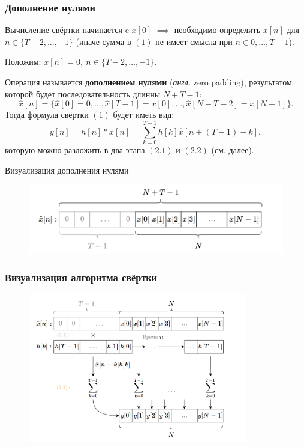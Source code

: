 \documentclass{beamer}
\begin{document}
    \begin{frame}
        \frametitle{Дополнение нулями}
        \justifying
        Вычисление свёртки начинается c $x[0]$ $\implies$ необходимо определить $x[n]$ для $n \in \{T - 2, \dotsc, -1\}$ (иначе сумма в $(1)$ не имеет смысла при $n \in {0, \dotsc, T - 1}$). 
        \par
        Положим: $x[n] = 0,\ n \in \{T-2, \dotsc, -1\}$.
        \par
        Операция называется {\bf дополнением нулями} ({\it англ.} zero padding), результатом которой будет последовательность длинны $N + T - 1$: 
        $$\hat x[n] = \{\hat x[0] = 0, \dotsc, \hat x[T - 1] = x[0], \dotsc, \hat x[N - T - 2] = x[N - 1]\}.$$
        Тогда формула свёртки $(1)$ будет иметь вид:
        \begin{equation}
            y[n] = h[n] * x[n] = \sum_{k=0}^{T - 1}h[k] \hat x[n + (T - 1) - k], \label{eq:conv_pad}
        \end{equation}
        которую можно разложить в два этапа $(2.1)$ и $(2.2)$ (см. далее).
    \end{frame}
    \begin{frame}{Визуализация дополнения нулями}
        \begin{figure}[!tbp]
               \centering
               \includegraphics[width=\textwidth]{pics/padding.png}
               \captionsetup{justification=centering}
        \end{figure}
    \end{frame}
    \begin{frame}
        \frametitle{Визуализация алгоритма свёртки}
        \begin{figure}[!tbp]
           \centering
           \includegraphics[width=0.85\textwidth]{pics/convolve.png}
           \captionsetup{justification=centering}
       \end{figure}
    \end{frame}
\end{document}
